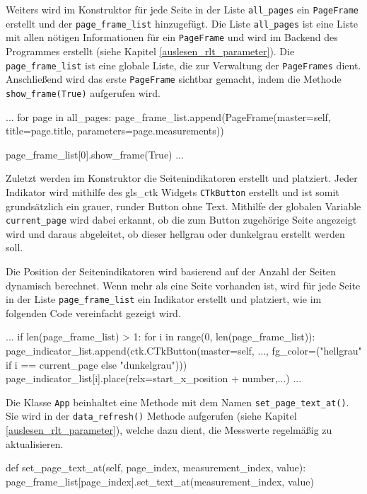 Weiters wird im Konstruktor für jede Seite in der Liste \lstinline{all_pages} ein \lstinline{PageFrame} erstellt und der \lstinline{page_frame_list} hinzugefügt. Die Liste \lstinline{all_pages} ist eine Liste mit allen nötigen Informationen für ein \lstinline{PageFrame} und wird im Backend des Programmes erstellt (siehe Kapitel \ref{auslesen_rlt_parameter}). Die \lstinline{page_frame_list} ist eine globale Liste, die zur Verwaltung der \lstinline{PageFrames} dient. Anschließend wird das erste \lstinline{PageFrame} sichtbar gemacht, indem die Methode \lstinline{show_frame(True)} aufgerufen wird.

\begin{pythoncode}
...	
		for page in all_pages:
			page_frame_list.append(PageFrame(master=self, title=page.title, parameters=page.measurements))
   
		page_frame_list[0].show_frame(True)
...
\end{pythoncode}

Zuletzt werden im Konstruktor die Seitenindikatoren erstellt und platziert. Jeder Indikator wird mithilfe des \gls{gls_ctk} Widgets \lstinline{CTkButton} erstellt und ist somit grundsätzlich ein grauer, runder Button ohne Text. Mithilfe der globalen Variable \lstinline{current_page} wird dabei erkannt, ob die zum Button zugehörige Seite angezeigt wird und daraus abgeleitet, ob dieser hellgrau oder dunkelgrau erstellt werden soll.

Die Position der Seitenindikatoren wird basierend auf der Anzahl der Seiten dynamisch berechnet. Wenn mehr als eine Seite vorhanden ist, wird für jede Seite in der Liste \lstinline{page_frame_list} ein Indikator erstellt und platziert, wie im folgenden Code vereinfacht gezeigt wird.

\begin{pythoncode}
...
		if len(page_frame_list) > 1:
			for i in range(0, len(page_frame_list)):
				page_indicator_list.append(ctk.CTkButton(master=self, ..., fg_color=("hellgrau" if i == current_page else "dunkelgrau")))
				page_indicator_list[i].place(relx=start_x_position + number,...)
...
\end{pythoncode}

Die Klasse \lstinline{App} beinhaltet eine Methode mit dem Namen \lstinline{set_page_text_at()}. Sie wird in der \lstinline{data_refresh()} Methode aufgerufen (siehe Kapitel \ref{auslesen_rlt_parameter}), welche dazu dient, die Messwerte regelmäßig zu aktualisieren.

\begin{pythoncode}
	def set_page_text_at(self, page_index, measurement_index, value):
    	page_frame_list[page_index].set_text_at(measurement_index, value)
\end{pythoncode}

